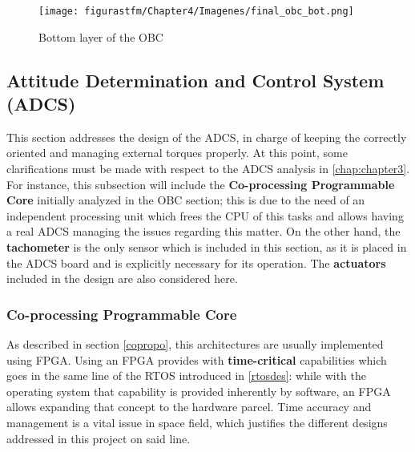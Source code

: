 		\begin{figure} [H]
		\raggedleft
			\begin{minipage}{10cm}
			\texttt{[image: figurastfm/Chapter4/Imagenes/final\_obc\_bot.png]}
			\caption{Bottom layer of the \acrshort{OBC}}     \label{botfinalobc}
						  \end{minipage}
			\vspace{-2cm}

\end{figure}


\newpage
\subsection{Attitude Determination and Control System (ADCS)}

This section addresses the design of the \acrshort{ADCS}, in charge of keeping the  correctly oriented and managing external torques properly. At this point, some clarifications must be made with respect to the \acrshort{ADCS} analysis in \autoref{chap:chapter3}. For instance, this subsection will include the \textbf{Co-processing Programmable Core} initially analyzed in the \acrshort{OBC} section; this is due to the need of an independent processing unit which frees the \acrshort{CPU} of this tasks and allows having a real \acrshort{ADCS} managing the issues regarding this matter. On the  other hand, the \textbf{tachometer} is the only sensor which is included in this section, as it is placed in the \acrshort{ADCS} board and is explicitly necessary for its operation. The \textbf{actuators} included in the design are also considered here.

\subsubsection{Co-processing Programmable Core}

As described in section \ref{copropo}, this architectures are usually implemented using \acrshort{FPGA}. Using an \acrshort{FPGA} provides with \textbf{time-critical} capabilities which goes in the same line of the \acrshort{RTOS} introduced in \autoref{rtosdes}: while with the operating system that capability is provided inherently by software, an \acrshort{FPGA} allows expanding that concept to the hardware parcel. Time accuracy and management is a vital issue in space field, which justifies the different designs addressed in this project on said line. 

